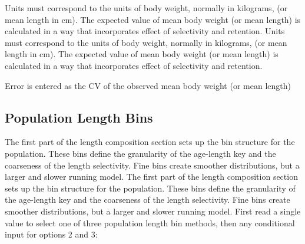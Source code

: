 Units must correspond to the units of body weight, normally in kilograms, (or mean length in cm). The expected value of mean body weight (or mean length) is calculated in a way that incorporates effect of selectivity and retention.
Units must correspond to the units of body weight, normally in kilograms, (or mean length in cm). The expected value of mean body weight (or mean length) is calculated in a way that incorporates effect of selectivity and retention.

Error is entered as the CV of the observed mean body weight (or mean length)

\subsection{Population Length Bins}
The first part of the length composition section sets up the bin structure for the population. These bins define the granularity of the age-length key and the coarseness of the length selectivity. Fine bins create smoother distributions, but a larger and slower running model.
The first part of the length composition section sets up the bin structure for the population. These bins define the granularity of the age-length key and the coarseness of the length selectivity. Fine bins create smoother distributions, but a larger and slower running model.
First read a single value to select one of three population length bin methods, then any conditional input for options 2 and 3:

